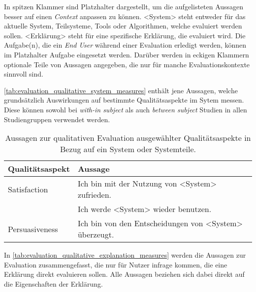 In spitzen Klammer sind Platzhalter dargestellt, um die aufgelisteten Aussagen besser auf einen \textit{Context} anpassen zu können. \glqq <System>\grqq{} steht entweder für das aktuelle System, Teilsysteme, Tools oder Algorithmen, welche evaluiert werden sollen. \glqq <Erklärung>\grqq{} steht für eine spezifische Erklärung, die evaluiert wird. Die Aufgabe(n), die ein \textit{End User} während einer Evaluation erledigt werden, können im Platzhalter \glqq Aufgabe\grqq{} eingesetzt werden. Darüber werden in eckigen Klammern optionale Teile von Aussagen angegeben, die nur für manche Evaluationskontexte sinnvoll sind.

\autoref{tab:evaluation_qualitative_system_measures} enthält jene Aussagen, welche grundsätzlich Auswirkungen auf bestimmte Qualitätsaspekte im Sytem messen. Diese können sowohl bei \textit{with-in subject} als auch \textit{between subject} Studien in allen Studiengruppen verwendet werden.

\begin{table}[htb!]
    \begin{center}
        \begin{tabular}{|p{} p{}|}
            \hline
            \textbf{Qualitätsaspekt} & \textbf{Aussage} \\
            \hline
            \hline
            Satisfaction    & Ich bin mit der Nutzung von <System> zufrieden.
                                \cite[vgl.][]{balog_measuring_2020} \\
                            & Ich werde <System> wieder benutzen.
                                \cite[vgl.][]{balog_measuring_2020} \\
            \hline
            Persuasiveness  & Ich bin von den Entscheidungen von <System> überzeugt.
                                \cite[vgl.][]{tsai_effects_2020} \\
            \hline
        \end{tabular}
    \end{center}
    \caption{Aussagen zur qualitativen Evaluation ausgewählter Qualitätsaspekte in Bezug auf ein System oder Systemteile.}
    \label{tab:evaluation_qualitative_system_measures}
\end{table}

In \autoref{tab:evaluation_qualitative_explanation_measures} werden die Aussagen zur Evaluation zusammengefasst, die nur für Nutzer infrage kommen, die eine Erklärung direkt evaluieren sollen. Alle Aussagen beziehen sich dabei direkt auf die Eigenschaften der Erklärung.

